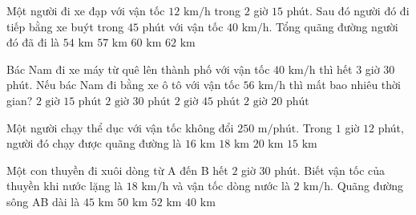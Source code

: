 \begin{ex} %
Một người đi xe đạp với vận tốc $12\text{ km/h}$ trong $2$ giờ $15$ phút. Sau đó người đó đi tiếp bằng xe buýt trong $45$ phút với vận tốc $40\text{ km/h}$. Tổng quãng đường người đó đã đi là
\choice
{$54\text{ km}$}
{\True $57\text{ km}$}
{$60\text{ km}$}
{$62\text{ km}$}
\end{ex}

\begin{ex} %
Bác Nam đi xe máy từ quê lên thành phố với vận tốc $40\text{ km/h}$ thì hết $3$ giờ $30$ phút. Nếu bác Nam đi bằng xe ô tô với vận tốc $56\text{ km/h}$ thì mất bao nhiêu thời gian?
\choice
{$2\text{ giờ } 15\text{ phút}$}
{\True $2\text{ giờ } 30\text{ phút}$}
{$2\text{ giờ } 45\text{ phút}$}
{$2\text{ giờ } 20\text{ phút}$}
\end{ex}

\begin{ex} %
Một người chạy thể dục với vận tốc không đổi $250\text{ m/phút}$. Trong $1$ giờ $12$ phút, người đó chạy được quãng đường là
\choice
{$16\text{ km}$}
{\True $18\text{ km}$}
{$20\text{ km}$}
{$15\text{ km}$}
\end{ex}

\begin{ex} %
Một con thuyền đi xuôi dòng từ A đến B hết $2$ giờ $30$ phút. Biết vận tốc của thuyền khi nước lặng là $18\text{ km/h}$ và vận tốc dòng nước là $2\text{ km/h}$. Quãng đường sông AB dài là
\choice
{$45\text{ km}$}
{\True $50\text{ km}$}
{$52\text{ km}$}
{$40\text{ km}$}
\end{ex}

